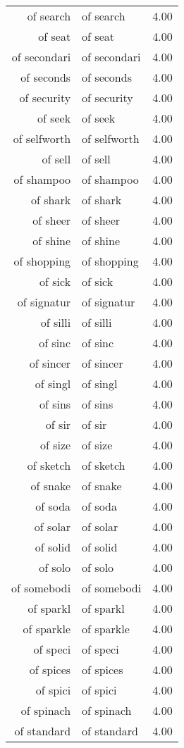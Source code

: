 \begin{table}[ht]
\begin{tabular}{rlr}
  of search & of search & 4.00 \\ 
  of seat & of seat & 4.00 \\ 
  of secondari & of secondari & 4.00 \\ 
  of seconds & of seconds & 4.00 \\ 
  of security & of security & 4.00 \\ 
  of seek & of seek & 4.00 \\ 
  of selfworth & of selfworth & 4.00 \\ 
  of sell & of sell & 4.00 \\ 
  of shampoo & of shampoo & 4.00 \\ 
  of shark & of shark & 4.00 \\ 
  of sheer & of sheer & 4.00 \\ 
  of shine & of shine & 4.00 \\ 
  of shopping & of shopping & 4.00 \\ 
  of sick & of sick & 4.00 \\ 
  of signatur & of signatur & 4.00 \\ 
  of silli & of silli & 4.00 \\ 
  of sinc & of sinc & 4.00 \\ 
  of sincer & of sincer & 4.00 \\ 
  of singl & of singl & 4.00 \\ 
  of sins & of sins & 4.00 \\ 
  of sir & of sir & 4.00 \\ 
  of size & of size & 4.00 \\ 
  of sketch & of sketch & 4.00 \\ 
  of snake & of snake & 4.00 \\ 
  of soda & of soda & 4.00 \\ 
  of solar & of solar & 4.00 \\ 
  of solid & of solid & 4.00 \\ 
  of solo & of solo & 4.00 \\ 
  of somebodi & of somebodi & 4.00 \\ 
  of sparkl & of sparkl & 4.00 \\ 
  of sparkle & of sparkle & 4.00 \\ 
  of speci & of speci & 4.00 \\ 
  of spices & of spices & 4.00 \\ 
  of spici & of spici & 4.00 \\ 
  of spinach & of spinach & 4.00 \\ 
  of standard & of standard & 4.00 \\ 

\end{tabular}
\end{table}
